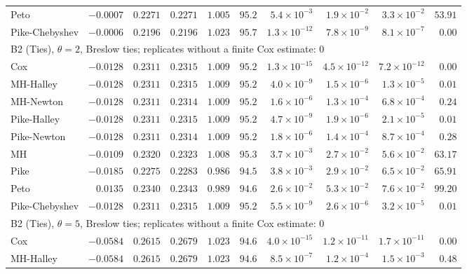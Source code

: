 \begin{landscape}
\begin{longtable}{lrrrrrrrrr}
Peto & $-0.0007$ & $0.2271$ & $0.2271$ & $1.005$ & $95.2$ & $5.4 \times 10^{-3}$ & $1.9 \times 10^{-2}$ & $3.3 \times 10^{-2}$ & $53.91$ \\
Pike-Chebyshev & $-0.0006$ & $0.2196$ & $0.2196$ & $1.023$ & $95.7$ & $1.3 \times 10^{-12}$ & $7.8 \times 10^{-9}$ & $8.1 \times 10^{-7}$ & $0.00$ \\
\multicolumn{10}{l}{B2 (Ties), $\theta = 2$, Breslow ties; replicates without a finite Cox estimate: 0} \\
Cox & $-0.0128$ & $0.2311$ & $0.2315$ & $1.009$ & $95.2$ & $1.3 \times 10^{-15}$ & $4.5 \times 10^{-12}$ & $7.2 \times 10^{-12}$ & $0.00$ \\
MH-Halley & $-0.0128$ & $0.2311$ & $0.2315$ & $1.009$ & $95.2$ & $4.0 \times 10^{-9}$ & $1.5 \times 10^{-6}$ & $1.3 \times 10^{-5}$ & $0.01$ \\
MH-Newton & $-0.0128$ & $0.2311$ & $0.2314$ & $1.009$ & $95.2$ & $1.6 \times 10^{-6}$ & $1.3 \times 10^{-4}$ & $6.8 \times 10^{-4}$ & $0.24$ \\
Pike-Halley & $-0.0128$ & $0.2311$ & $0.2315$ & $1.009$ & $95.2$ & $4.7 \times 10^{-9}$ & $1.9 \times 10^{-6}$ & $2.1 \times 10^{-5}$ & $0.01$ \\
Pike-Newton & $-0.0128$ & $0.2311$ & $0.2314$ & $1.009$ & $95.2$ & $1.8 \times 10^{-6}$ & $1.4 \times 10^{-4}$ & $8.7 \times 10^{-4}$ & $0.28$ \\
MH & $-0.0109$ & $0.2320$ & $0.2323$ & $1.008$ & $95.3$ & $3.7 \times 10^{-3}$ & $2.7 \times 10^{-2}$ & $5.6 \times 10^{-2}$ & $63.17$ \\
Pike & $-0.0185$ & $0.2275$ & $0.2283$ & $0.986$ & $94.5$ & $3.8 \times 10^{-3}$ & $2.9 \times 10^{-2}$ & $6.5 \times 10^{-2}$ & $65.91$ \\
Peto & $0.0135$ & $0.2340$ & $0.2343$ & $0.989$ & $94.6$ & $2.6 \times 10^{-2}$ & $5.3 \times 10^{-2}$ & $7.6 \times 10^{-2}$ & $99.20$ \\
Pike-Chebyshev & $-0.0128$ & $0.2311$ & $0.2315$ & $1.009$ & $95.2$ & $5.5 \times 10^{-9}$ & $2.6 \times 10^{-6}$ & $3.2 \times 10^{-5}$ & $0.01$ \\
\multicolumn{10}{l}{B2 (Ties), $\theta = 5$, Breslow ties; replicates without a finite Cox estimate: 0} \\
Cox & $-0.0584$ & $0.2615$ & $0.2679$ & $1.023$ & $94.6$ & $4.0 \times 10^{-15}$ & $1.2 \times 10^{-11}$ & $1.7 \times 10^{-11}$ & $0.00$ \\
MH-Halley & $-0.0584$ & $0.2615$ & $0.2679$ & $1.023$ & $94.6$ & $8.5 \times 10^{-7}$ & $1.2 \times 10^{-4}$ & $1.5 \times 10^{-3}$ & $0.48$ \\

\end{longtable}
\end{landscape}
